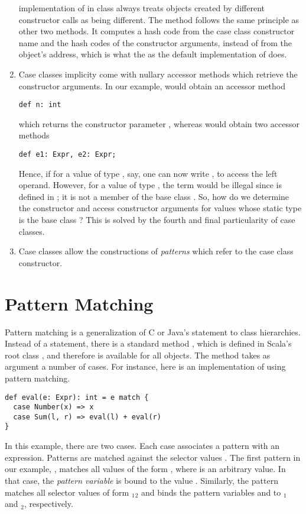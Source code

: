 \begin{enumerate}
implementation of  in class  always treats
objects created by different constructor calls as being different.
The  method follows the same principle as other two
methods. It computes a hash code from the case class constructor name
and the hash codes of the constructor arguments, instead of from the object's
address, which is what the as the default implementation of  does.
\item 
Case classes implicity come with nullary accessor methods which
retrieve the constructor arguments.
In our example,  would obtain an accessor method
\begin{lstlisting}
def n: int
\end{lstlisting}
which returns the constructor parameter , whereas  would obtain two accessor methods
\begin{lstlisting}
def e1: Expr, e2: Expr;
\end{lstlisting}
Hence, if for a value  of type , say, one can now
write , to access the left operand. However, for a value
 of type , the term  would be illegal
since  is defined in ; it is not a member of the
base class . 
So, how do we determine the constructor and access constructor
arguments for values whose static type is the base class ?
This is solved by the fourth and final particularity of case classes.
\item 
Case classes allow the constructions of {\em patterns} which refer to
the case class constructor.
\end{enumerate}

\section{Pattern Matching}

Pattern matching is a generalization of C or Java's 
statement to class hierarchies. Instead of a  statement,
there is a standard method , which is defined in Scala's
root class , and therefore is available for all objects.
The  method takes as argument a number of cases. 
For instance, here is an implementation of  using 
pattern matching.
\begin{lstlisting}
def eval(e: Expr): int = e match { 
  case Number(x) => x 
  case Sum(l, r) => eval(l) + eval(r) 
}
\end{lstlisting}
In this example, there are two cases. Each case associates a pattern
with an expression. Patterns are matched against the selector
values .  The first pattern in our example,
, matches all values of the form , 
where  is an arbitrary value.  In that case, the {\em pattern
variable}  is bound to the value . Similarly, the
pattern  matches all selector values of form
$_1$$_2$\code{)} and binds the pattern variables
 and  
to $_1$ and $_2$, respectively. 

